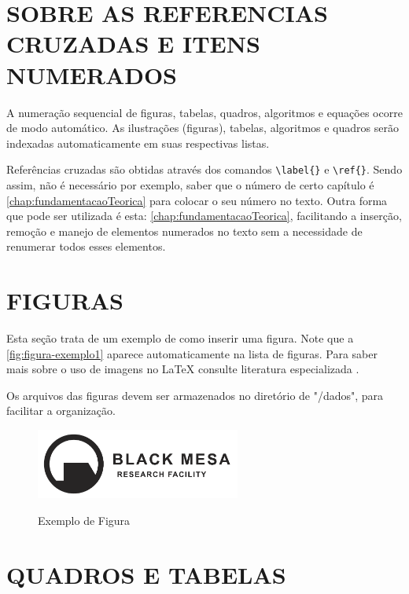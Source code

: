 \section{SOBRE AS REFERENCIAS CRUZADAS E ITENS NUMERADOS}
\label{sec:refs}

A numeração sequencial de figuras, tabelas, quadros, algoritmos e equações ocorre de modo automático. As ilustrações (figuras), tabelas, algoritmos e quadros serão indexadas automaticamente em suas respectivas listas. 

Referências cruzadas são obtidas através dos comandos \verb|\label{}| e \verb|\ref{}|. Sendo assim, não é necessário por exemplo, saber que o número de certo capítulo é \ref{chap:fundamentacaoTeorica} para colocar o seu número no texto. Outra forma que pode ser utilizada é esta: \autoref{chap:fundamentacaoTeorica}, facilitando a inserção, remoção e manejo de elementos numerados no texto sem a necessidade de renumerar todos esses elementos.

\section{FIGURAS}
\label{sec:figuras}

Esta seção trata de um exemplo de como inserir uma figura. Note que a \autoref{fig:figura-exemplo1} aparece automaticamente na lista de figuras. Para saber mais sobre o uso de imagens no \LaTeX{} consulte literatura especializada \cite{Goossens2007}.

Os arquivos das figuras devem ser armazenados no diretório de "/dados", para facilitar a organização.

\begin{figure}[!htb]
    \centering
    \caption{Exemplo de Figura}
    \includegraphics[width=0.6\textwidth]{dados/figuras/orientacoes/blackmesalogo.eps}
    \label{fig:figura-exemplo1}
\end{figure}

\section{QUADROS E TABELAS}
\label{sec:tabelas}

